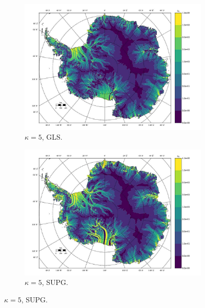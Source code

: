 \begin{figure}
  \begin{subfigure}[b]{0.45\linewidth}
    \includegraphics[width=\linewidth]{images/balance_velocity/antarctica/d_U_ob_S/Ubar_10H_kappa_5_GLS.jpg}
  \caption{$\kappa = 5$, GLS.}
  \label{antarctica_bv_image_kappa_5_GLS_U_ob_S}
  \end{subfigure}
  \begin{subfigure}[b]{0.45\linewidth}
    \includegraphics[width=\linewidth]{images/balance_velocity/antarctica/d_U_ob_S/Ubar_10H_kappa_5_SUPG.jpg}
  \caption{$\kappa = 5$, SUPG.}
  \label{antarctica_bv_image_kappa_5_SUPG_U_ob_S}
  \end{subfigure}


\end{figure}
